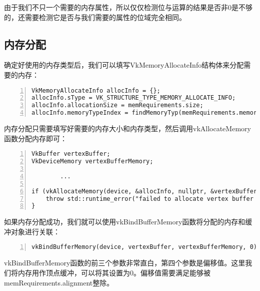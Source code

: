 \documentclass{ctexart}
\begin{document}
由于我们不只一个需要的内存属性，所以仅仅检测位与运算的结果是否非0是不够的，还需要检测它是否与我们需要的属性的位域完全相同。

\subsection{内存分配}

确定好使用的内存类型后，我们可以填写VkMemoryAllocateInfo结构体来分配需要的内存：

\begin{lstlisting}[language={[ANSI]C},keywordstyle=\color{blue!70},commentstyle=\color{red!50!green!50!blue!50},frame=shadowbox, rulesepcolor=\color{red!20!green!20!blue!20},basicstyle=\small,numbers=left, numberstyle=\tiny,breaklines=true]
VkMemoryAllocateInfo allocInfo = {};
allocInfo.sType = VK_STRUCTURE_TYPE_MEMORY_ALLOCATE_INFO;
allocInfo.allocationSize = memRequirements.size;
allocInfo.memoryTypeIndex = findMemoryTyp(memRequirements.memoryTypeBits, VK_MEMORY_PROPERTY_HOST_VISIBLE_BIT | VK_MEMORY_PROPERTY_HOST_COHERENT_BIT);
\end{lstlisting}

内存分配只需要填写好需要的内存大小和内存类型，然后调用vkAllocateMemory函数分配内存即可：

\begin{lstlisting}[language={[ANSI]C},keywordstyle=\color{blue!70},commentstyle=\color{red!50!green!50!blue!50},frame=shadowbox, rulesepcolor=\color{red!20!green!20!blue!20},basicstyle=\small,numbers=left, numberstyle=\tiny,breaklines=true]
VkBuffer vertexBuffer;
VkDeviceMemory vertexBufferMemory;

		...

if (vkAllocateMemory(device, &allocInfo, nullptr, &vertexBufferMemory) != VK_SUCCESS) {
	throw std::runtime_error("failed to allocate vertex buffer memory!");
}
\end{lstlisting}

如果内存分配成功，我们就可以使用vkBindBufferMemory函数将分配的内存和缓冲对象进行关联：

\begin{lstlisting}[language={[ANSI]C},keywordstyle=\color{blue!70},commentstyle=\color{red!50!green!50!blue!50},frame=shadowbox, rulesepcolor=\color{red!20!green!20!blue!20},basicstyle=\small,numbers=left, numberstyle=\tiny,breaklines=true]
vkBindBufferMemory(device, vertexBuffer, vertexBufferMemory, 0);
\end{lstlisting}

vkBindBufferMemory函数的前三个参数非常直白，第四个参数是偏移值。这里我们将内存用作顶点缓冲，可以将其设置为0。偏移值需要满足能够被memRequirements.alignment整除。
\end{document}
